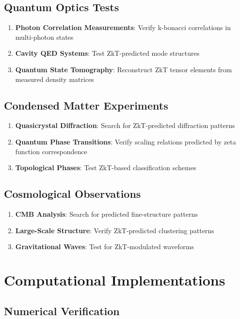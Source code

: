 \documentclass[12pt]{article}
\theoremstyle{plain}
\theoremstyle{definition}
\begin{document}
\subsection{Quantum Optics Tests}

\begin{enumerate}
\item \textbf{Photon Correlation Measurements}: Verify k-bonacci correlations in multi-photon states
\item \textbf{Cavity QED Systems}: Test ZkT-predicted mode structures
\item \textbf{Quantum State Tomography}: Reconstruct ZkT tensor elements from measured density matrices
\end{enumerate}

\subsection{Condensed Matter Experiments}

\begin{enumerate}
\item \textbf{Quasicrystal Diffraction}: Search for ZkT-predicted diffraction patterns
\item \textbf{Quantum Phase Transitions}: Verify scaling relations predicted by zeta function correspondence
\item \textbf{Topological Phases}: Test ZkT-based classification schemes
\end{enumerate}

\subsection{Cosmological Observations}

\begin{enumerate}
\item \textbf{CMB Analysis}: Search for predicted fine-structure patterns
\item \textbf{Large-Scale Structure}: Verify ZkT-predicted clustering patterns
\item \textbf{Gravitational Waves}: Test for ZkT-modulated waveforms
\end{enumerate}

\section{Computational Implementations}

\subsection{Numerical Verification}
\end{document}
